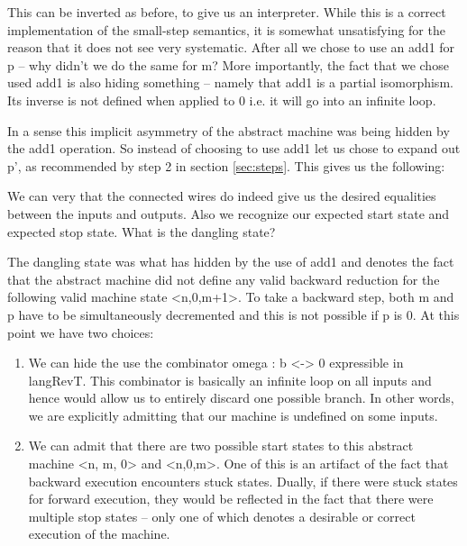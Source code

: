\documentclass{llncs}
\begin{document}
This can be inverted as before, to give us an interpreter. While this
is a correct implementation of the small-step semantics, it is
somewhat unsatisfying for the reason that it does not see very
systematic. After all we chose to use an {{add1}} for {{p}} -- why
didn't we do the same for {{m}}? More importantly, the fact that we
chose used {{add1}} is also hiding something -- namely that {{add1}}
is a partial isomorphism. Its inverse is not defined when applied to
{{0}} i.e. it will go into an infinite loop. 

In a sense this implicit asymmetry of the abstract machine was being
hidden by the {{add1}} operation. So instead of choosing to use
{{add1}} let us chose to expand out {{p'}}, as recommended by step 2
in section \ref{sec:steps}. This gives us the following: 


\begin{center}
\end{center}

We can very that the connected wires do indeed give us the desired
equalities between the inputs and outputs. Also we recognize our
expected start state and expected stop state. What is the dangling
state?

The dangling state was what has hidden by the use of {{add1}} and
denotes the fact that the abstract machine did not define any valid
backward reduction for the following valid machine state
{{<n,0,m+1>}}. To take a backward step, both {{m}} and {{p}} have to
be simultaneously decremented and this is not possible if {{p}} is
{{0}}.  At this point we have two choices:

\begin{enumerate}
\item We can hide the use the combinator {{omega : b <-> 0}}
  expressible in {{langRevT}}. This combinator is basically an
  infinite loop on all inputs and hence would allow us to entirely
  discard one possible branch. In other words, we are explicitly
  admitting that our machine is undefined on some inputs.

\item We can admit that there are two possible start states to this
  abstract machine {{<n, m, 0>}} and {{<n,0,m>}}. One of this is an
  artifact of the fact that backward execution encounters stuck
  states. Dually, if there were stuck states for forward execution,
  they would be reflected in the fact that there were multiple stop
  states -- only one of which denotes a desirable or correct execution
  of the machine.

\end{enumerate}
\end{document}
